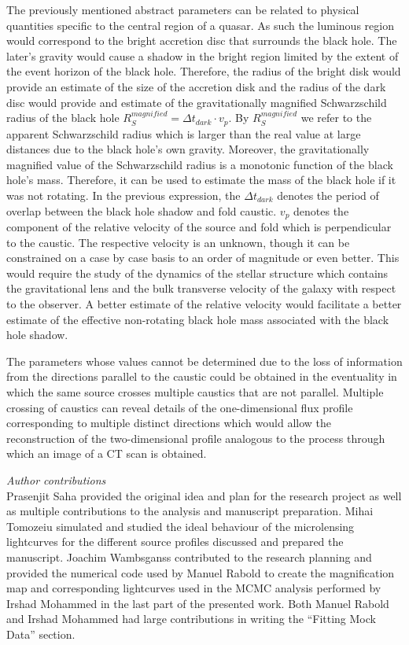 \documentclass[usenatbib]{mn2e}
\begin{document}
The previously mentioned abstract parameters can be related to
physical quantities specific to the central region of a quasar.  As
such the luminous region would correspond to the bright accretion disc
that surrounds the black hole. The later's gravity would cause a
shadow in the bright region limited by the extent of the event horizon
of the black hole. Therefore, the radius of the bright disk would
provide an estimate of the size of the accretion disk and the radius
of the dark disc would provide and estimate of the gravitationally
magnified Schwarzschild radius of the black hole $R_{S}^{magnified} =
\Delta t_{dark} \cdot v_p$.  By $R_{S}^{magnified}$ we refer to the
apparent Schwarzschild radius which is larger than the real value at
large distances due to the black hole's own gravity.  Moreover, the
gravitationally magnified value of the Schwarzschild radius is a
monotonic function of the black hole's mass. Therefore, it can be used
to estimate the mass of the black hole if it was not rotating. In the
previous expression, the $\Delta t_{dark}$ denotes the period of
overlap between the black hole shadow and fold caustic.  $v_p$ denotes
the component of the relative velocity of the source and fold which is
perpendicular to the caustic.  The respective velocity is an unknown,
though it can be constrained on a case by case basis to an order of
magnitude or even better. This would require the study of the dynamics
of the stellar structure which contains the gravitational lens and the bulk
transverse velocity of the galaxy with respect to the observer.  A
better estimate of the relative velocity would facilitate a better
estimate of the effective non-rotating black hole mass associated with
the black hole shadow.

    
The parameters whose values cannot be determined due to the 
loss of information from the directions parallel to the 
caustic could be obtained in the eventuality in which 
the same source crosses multiple caustics that are not parallel. 
Multiple crossing of caustics can reveal details of 
the one-dimensional flux profile corresponding to multiple distinct 
directions which would allow the reconstruction of the 
two-dimensional profile analogous to the process through 
which an image of a CT scan is obtained.  

\textit{Author contributions}\\
Prasenjit Saha provided the original idea and plan for the research project as well as multiple contributions to the analysis 
and manuscript preparation. Mihai Tomozeiu simulated and studied the ideal behaviour of the microlensing lightcurves for the 
different source profiles discussed and prepared the manuscript.
Joachim Wambsganss contributed to the research planning and provided the numerical code used by Manuel Rabold to create 
the magnification map and corresponding lightcurves used in the MCMC analysis performed by Irshad Mohammed in the last 
part of the presented work. Both Manuel Rabold and Irshad Mohammed had large contributions in writing the ``Fitting Mock Data'' section.
\end{document}

